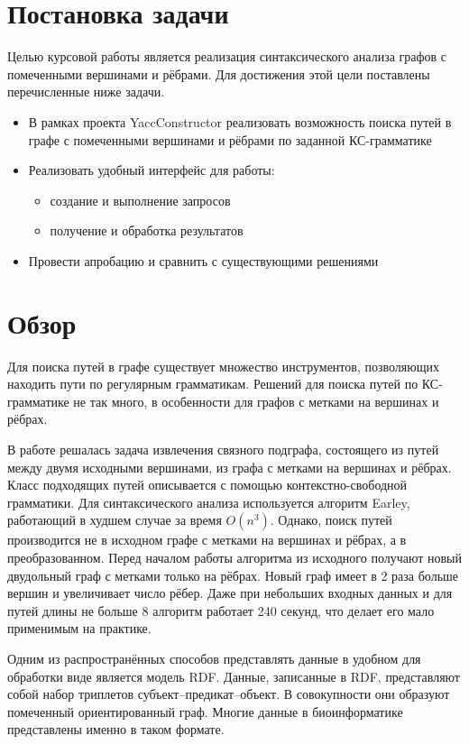 \documentclass[14pt]{matmex-diploma}
\begin{document}
\section{Постановка задачи}
Целью курсовой работы является реализация синтаксического анализа графов с помеченными вершинами и рёбрами. Для достижения этой цели поставлены перечисленные ниже задачи.
\begin{itemize}
    \item В рамках проекта YaccConstructor \cite{YaccConstructorPage} реализовать возможность поиска путей в графе с помеченными вершинами и рёбрами по заданной КС-грамматике
    \item Реализовать удобный интерфейс для работы:
    \begin{itemize}
    \item создание и выполнение запросов 
    \item получение и обработка результатов
    \end{itemize}
    \item Провести апробацию и сравнить с существующими решениями
\end{itemize}

\section{Обзор}
Для поиска путей в графе существует множество инструментов, позволяющих находить пути по регулярным грамматикам. Решений для поиска путей по КС-грамматике не так много, в особенности для графов с метками на вершинах и рёбрах.
 
В работе \cite{subgraph} решалась задача извлечения связного подграфа, состоящего из путей между двумя исходными вершинами, из графа с метками на вершинах и рёбрах. Класс подходящих путей описывается с помощью контекстно-свободной грамматики. Для синтаксического анализа используется алгоритм Earley, работающий в худшем случае за время $O(n^3)$. Однако, поиск путей производится не в исходном графе с метками на вершинах и рёбрах, а в преобразованном. Перед началом работы алгоритма из исходного получают новый двудольный граф с метками только на рёбрах. Новый граф имеет в 2 раза больше вершин и увеличивает число рёбер. Даже при небольших входных данных и для путей длины не больше 8 алгоритм работает 240 секунд, что делает его мало применимым на практике.

Одним из распространённых способов представлять данные в удобном для обработки виде является модель RDF. Данные, записанные в RDF, представляют собой набор триплетов субъект--предикат--объект. В совокупности они образуют помеченный ориентированный граф. Многие данные в биоинформатике представлены именно в таком формате.
\end{document}
